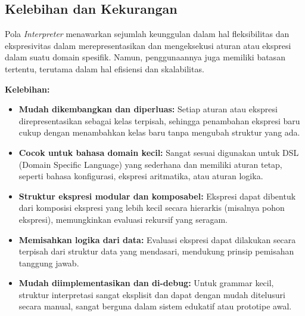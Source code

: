 \subsection{Kelebihan dan Kekurangan}

Pola \textit{Interpreter} menawarkan sejumlah keunggulan dalam hal fleksibilitas dan ekspresivitas dalam merepresentasikan dan mengeksekusi aturan atau ekspresi dalam suatu domain spesifik. Namun, penggunaannya juga memiliki batasan tertentu, terutama dalam hal efisiensi dan skalabilitas.

\textbf{Kelebihan:}
\begin{itemize}
	\item \textbf{Mudah dikembangkan dan diperluas:} Setiap aturan atau ekspresi direpresentasikan sebagai kelas terpisah, sehingga penambahan ekspresi baru cukup dengan menambahkan kelas baru tanpa mengubah struktur yang ada.
	
	\item \textbf{Cocok untuk bahasa domain kecil:} Sangat sesuai digunakan untuk DSL (Domain Specific Language) yang sederhana dan memiliki aturan tetap, seperti bahasa konfigurasi, ekspresi aritmatika, atau aturan logika.
	
	\item \textbf{Struktur ekspresi modular dan komposabel:} Ekspresi dapat dibentuk dari komposisi ekspresi yang lebih kecil secara hierarkis (misalnya pohon ekspresi), memungkinkan evaluasi rekursif yang seragam.
	
	\item \textbf{Memisahkan logika dari data:} Evaluasi ekspresi dapat dilakukan secara terpisah dari struktur data yang mendasari, mendukung prinsip pemisahan tanggung jawab.
	
	\item \textbf{Mudah diimplementasikan dan di-debug:} Untuk grammar kecil, struktur interpretasi sangat eksplisit dan dapat dengan mudah ditelusuri secara manual, sangat berguna dalam sistem edukatif atau prototipe awal.
\end{itemize}

